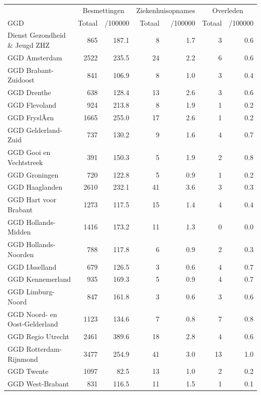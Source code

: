 \documentclass[
  english,
  man,floatsintext]{apa6}
\begin{document}
\begin{table}
\centering\begingroup\fontsize{10}{12}\selectfont

\begin{threeparttable}
\begin{tabular}{lrrrrrr}
\toprule
\multicolumn{1}{c}{ } & \multicolumn{2}{c}{Besmettingen} & \multicolumn{2}{c}{Ziekenhuisopnames} & \multicolumn{2}{c}{Overleden} \\
\cmidrule(l{3pt}r{3pt}){2-3} \cmidrule(l{3pt}r{3pt}){4-5} \cmidrule(l{3pt}r{3pt}){6-7}
GGD & Totaal & /100000 & Totaal & /100000 & Totaal & /100000\\
\midrule
Dienst Gezondheid \& Jeugd ZHZ & 865 & 187.1 & 8 & 1.7 & 3 & 0.6\\
GGD Amsterdam & 2522 & 235.5 & 24 & 2.2 & 6 & 0.6\\
GGD Brabant-Zuidoost & 841 & 106.9 & 8 & 1.0 & 3 & 0.4\\
GGD Drenthe & 638 & 128.4 & 13 & 2.6 & 3 & 0.6\\
GGD Flevoland & 924 & 213.8 & 8 & 1.9 & 1 & 0.2\\
GGD FryslÃ¢n & 1665 & 255.0 & 17 & 2.6 & 1 & 0.2\\
GGD Gelderland-Zuid & 737 & 130.2 & 9 & 1.6 & 4 & 0.7\\
GGD Gooi en Vechtstreek & 391 & 150.3 & 5 & 1.9 & 2 & 0.8\\
GGD Groningen & 720 & 122.8 & 5 & 0.9 & 1 & 0.2\\
GGD Haaglanden & 2610 & 232.1 & 41 & 3.6 & 3 & 0.3\\
GGD Hart voor Brabant & 1273 & 117.5 & 15 & 1.4 & 4 & 0.4\\
GGD Hollands-Midden & 1416 & 173.2 & 11 & 1.3 & 0 & 0.0\\
GGD Hollands-Noorden & 788 & 117.8 & 6 & 0.9 & 2 & 0.3\\
GGD IJsselland & 679 & 126.5 & 3 & 0.6 & 4 & 0.7\\
GGD Kennemerland & 935 & 169.3 & 5 & 0.9 & 4 & 0.7\\
GGD Limburg-Noord & 847 & 161.8 & 3 & 0.6 & 3 & 0.6\\
GGD Noord- en Oost-Gelderland & 1123 & 134.6 & 7 & 0.8 & 7 & 0.8\\
GGD Regio Utrecht & 2461 & 389.6 & 18 & 2.8 & 4 & 0.6\\
GGD Rotterdam-Rijnmond & 3477 & 254.9 & 41 & 3.0 & 13 & 1.0\\
GGD Twente & 1097 & 82.5 & 13 & 1.0 & 2 & 0.2\\
GGD West-Brabant & 831 & 116.5 & 11 & 1.5 & 1 & 0.1\\

\end{tabular}
\end{threeparttable}
\end{table}
\end{document}
